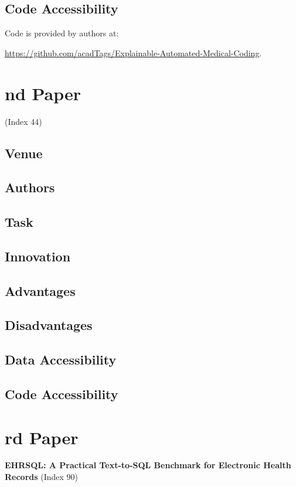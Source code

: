 \documentclass[12pt]{article}
\begin{document}
\subsection{Code Accessibility}
Code is provided by authors at:


\href{https://github.com/acadTags/Explainable-Automated-Medical-Coding}{https://github.com/acadTags/Explainable-Automated-Medical-Coding}.

\section{nd Paper}
\textbf{} (Index 44)
\subsection{Venue}

\subsection{Authors}

\subsection{Task}

\subsection{Innovation}

\subsection{Advantages}

\subsection{Disadvantages}

\subsection{Data Accessibility}

\subsection{Code Accessibility}



\section{rd Paper}
\textbf{EHRSQL: A Practical Text-to-SQL Benchmark for Electronic Health Records} (Index 90)
\end{document}
